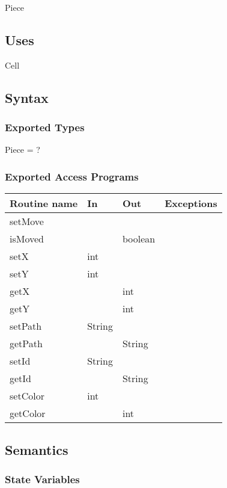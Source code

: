 \documentclass[12pt]{article}
\begin{document}
Piece

\subsection* {Uses}

Cell

\subsection* {Syntax}

\subsubsection* {Exported Types}

Piece = ?

\subsubsection* {Exported Access Programs}

\begin{tabular}{| l | l | l | l |}
\hline
\textbf{Routine name} & \textbf{In} & \textbf{Out} & \textbf{Exceptions}\\
\hline
setMove & ~ & ~ & ~\\
\hline
isMoved & ~ & boolean & ~\\
\hline
setX & int & ~ & ~\\
\hline
setY & int & ~ & ~\\
\hline
getX & ~ & int & ~\\
\hline
getY & ~ & int & ~\\
\hline
setPath & String & ~ & ~\\
\hline
getPath & ~  & String & ~\\
\hline
setId & String & ~ & ~\\
\hline
getId & ~ & String & ~\\
\hline
setColor & int & ~ & ~\\
\hline
getColor & ~ & int & ~\\
\hline
\end{tabular}

\subsection* {Semantics}

\subsubsection* {State Variables}
\end{document}
